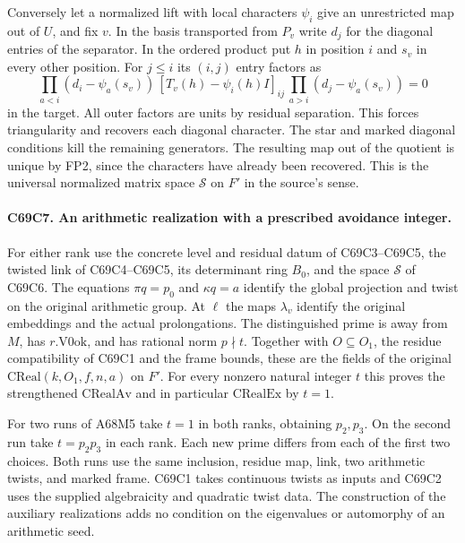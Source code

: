 Conversely let a normalized lift with local characters $\psi_i$
give an unrestricted map out of $U$, and fix $v$. In the basis
transported from $P_v$ write $d_j$ for the diagonal entries of
the separator. In the ordered product put $h$ in position $i$
and $s_v$ in every other position. For $j\le i$ its $(i,j)$
entry factors as
\[
 \prod_{a<i}(d_i-\psi_a(s_v))\,
 [T_v(h)-\psi_i(h)I]_{ij}\,
 \prod_{a>i}(d_j-\psi_a(s_v))=0
\]
in the target. All outer factors are units by residual separation.
This forces triangularity and recovers each diagonal character.
The star and marked diagonal conditions kill the remaining
generators. The resulting map out of the quotient is unique by
FP2, since the characters have already been recovered. This is the
universal normalized matrix space $\mathcal S$ on $F'$ in the
source's sense.

\paragraph{C69C7. An arithmetic realization with a prescribed avoidance integer.}
For either rank use the concrete level and residual datum of
C69C3--C69C5, the twisted link of C69C4--C69C5, its determinant
ring $B_0$, and the space $\mathcal S$ of C69C6. The equations
$\pi q=p_0$ and $\kappa q=a$ identify the global projection and
twist on the original arithmetic group. At $\ell$ the maps
$\lambda_v$ identify the original embeddings and the actual
prolongations. The distinguished prime is away from $M$, has
$r.\mathrm{V0ok}$, and has rational norm $p\nmid t$.
Together with $O\subseteq O_1$, the residue compatibility of
C69C1 and the frame bounds, these are the fields of the original
$\mathrm{CReal}(k,O_1,f,n,a)$ on $F'$. For every nonzero natural
integer $t$ this proves the strengthened $\mathrm{CRealAv}$ and
in particular $\mathrm{CRealEx}$ by $t=1$.

For two runs of A68M5 take $t=1$ in both ranks, obtaining
$p_2,p_3$. On the second run take $t=p_2p_3$ in each rank. Each
new prime differs from each of the first two choices. Both runs
use the same inclusion, residue map, link, two arithmetic twists,
and marked frame. C69C1 takes continuous twists as inputs and
C69C2 uses the supplied algebraicity and quadratic twist data.
The construction of the auxiliary realizations adds no condition
on the eigenvalues or automorphy of an arithmetic seed.
